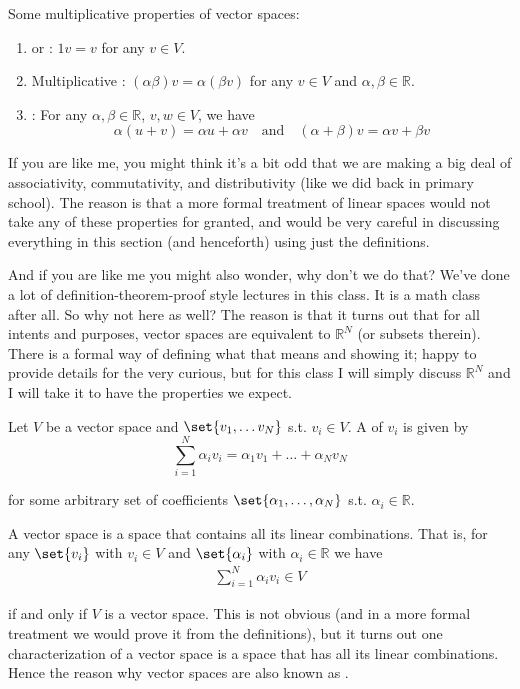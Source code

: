 \documentclass{article}
\begin{document}
Some multiplicative properties of vector spaces:
\begin{enumerate}
  \item {} or : $1 v = v$ for any $v \in V$.
  \item Multiplicative : $(\alpha \beta) v = \alpha (\beta v)$ for any $v \in V$ and $\alpha, \beta \in \mathbb{R}$.
  \item {}: For any $\alpha, \beta \in \mathbb{R}$, $v, w \in V$, we have
    \[
      \alpha (u + v) = \alpha u + \alpha v
      \quad
      \text{and}
      \quad
      (\alpha + \beta) v = \alpha v + \beta v
    \]
\end{enumerate}

\begin{remark}
  If you are like me, you might think it's a bit odd that we are making a big deal of associativity, commutativity, and distributivity (like we did back in primary school). The reason is that a more formal treatment of linear spaces would not take any of these properties for granted, and would be very careful in discussing everything in this section (and henceforth) using just the definitions.

  And if you are like me you might also wonder, why don't we do that? We've done a lot of definition-theorem-proof style lectures in this class. It is a math class after all. So why not here as well? The reason is that it turns out that for all intents and purposes, vector spaces are equivalent to $\mathbb{R}^N$ (or subsets therein). There is a formal way of defining what that means and showing it; happy to provide details for the very curious, but for this class I will simply discuss $\mathbb{R}^N$ and I will take it to have the properties we expect.
\end{remark}

\begin{definition}
  Let $V$ be a vector space and $\set{v_1, \ldots v_N}$ s.t. $v_i \in V$. A  of $v_i$ is given by
  \[
    \sum^{N}_{i = 1} \alpha_i v_i = \alpha_1 v_1 + \ldots + \alpha_N v_N
  \]

  for some arbitrary set of coefficients $\set{\alpha_1, \ldots, \alpha_N}$ s.t. $\alpha_i \in \mathbb{R}$.
\end{definition}

\begin{remark}
  A vector space is a space that contains all its linear combinations. That is, for any $\set{v_i}$ with $v_i \in V$ and $\set{\alpha_i}$ with $\alpha_i \in \mathbb{R}$ we have
  \begin{align*}
    \sum^{N}_{i = 1} \alpha_i v_i \in V
  \end{align*}

  if and only if $V$ is a vector space. This is not obvious (and in a more formal treatment we would prove it from the definitions), but it turns out one characterization of a vector space is a space that has all its linear combinations. Hence the reason why vector spaces are also known as .
\end{remark}
\end{document}
